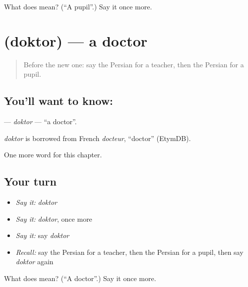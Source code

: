\begin{tcolorbox}[breakable,colback=teal!4,colframe=teal!35!black,title={Before you move on}]
What does  mean? (\textquotedblleft{}A pupil\textquotedblright{}.) Say it once more.
\end{tcolorbox}
\section[\texorpdfstring{\fa{دکتر} (doktor)}{دکتر (doktor)}]{ (doktor) — a doctor}

\label{lesson:FA-C115-doktor}



\begin{quote}
Before the new one: say the Persian for a teacher, then the Persian for a pupil.
\end{quote}

\subsection*{You'll want to know: }
\textbf{} — \emph{doktor} — \textquotedblleft{}a doctor\textquotedblright{}.

\begin{cousinweb}
\emph{doktor} is borrowed from French \emph{docteur}, \textquotedblleft{}doctor\textquotedblright{} (EtymDB).
\end{cousinweb}

\begin{grammarlens}[title={What you've built}]
One more word for this chapter.
\end{grammarlens}

\subsection*{Your turn}
\begin{itemize}
\raggedright
  \item \emph{Say it:} \emph{doktor}
  \item \emph{Say it:} \emph{doktor}, once more
  \item \emph{Say it:} say \emph{doktor}
  \item \emph{Recall:} say the Persian for a teacher, then the Persian for a pupil, then say \emph{doktor} again
\end{itemize}

\begin{tcolorbox}[breakable,colback=teal!4,colframe=teal!35!black,title={Before you move on}]
What does  mean? (\textquotedblleft{}A doctor\textquotedblright{}.) Say it once more.
\end{tcolorbox}
